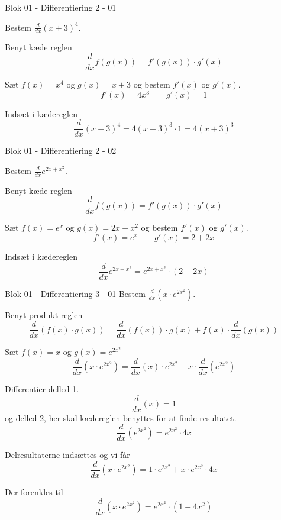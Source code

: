 \documentclass{article}
\begin{document}
\begin{exercise}{Blok 01 - Differentiering 2 - 01}

Bestem $\frac{d}{dx} (x + 3)^4$.


\hint
Benyt kæde reglen
\[
\frac{d}{dx} f(g(x)) = f'(g(x)) \cdot g'(x)
\]

\hint
Sæt $f(x) = x^4$ og $g(x) = x + 3$ og bestem $f'(x)$ og $g'(x)$.
\[
f'(x) = 4 x^3 \qquad g'(x) = 1
\]

\hint
Indsæt i kædereglen
\[
\frac{d}{dx} (x + 3)^4 = 4 (x + 3)^3 \cdot 1 = 4 (x + 3)^3
\]

\end{exercise}

\begin{exercise}{Blok 01 - Differentiering 2 - 02}

Bestem $\frac{d}{dx} e^{2x + x^2}$.


\hint
Benyt kæde reglen
\[
\frac{d}{dx} f(g(x)) = f'(g(x)) \cdot g'(x)
\]

\hint
Sæt $f(x) = e^x$ og $g(x) = 2x + x^2$ og bestem $f'(x)$ og $g'(x)$.
\[
f'(x) = e^x \qquad g'(x) = 2 + 2x
\]

\hint
Indsæt i kædereglen
\[
\frac{d}{dx} e^{2x + x^2} = e^{2x + x^2} \cdot (2 + 2x)
\]

\end{exercise}


\begin{exercise}{Blok 01 - Differentiering 3 - 01}
Bestem $\frac{d}{dx} \left( x \cdot e^{2x^2} \right)$.


\hint
Benyt produkt reglen
\[
\frac{d}{dx} \left( f(x) \cdot g(x) \right) = \frac{d}{dx} \left( f(x) \right) \cdot g(x) + f(x) \cdot \frac{d}{dx} \left( g(x) \right)
\]

\hint
Sæt $f(x) = x$ og $g(x) = e^{2x^2}$
\[
\frac{d}{dx} \left( x \cdot e^{2x^2} \right) = \frac{d}{dx} \left( x \right) \cdot e^{2x^2} + x \cdot \frac{d}{dx} \left( e^{2x^2} \right)
\]

\hint
Differentier delled 1.
\[
\frac{d}{dx} \left( x \right) = 1
\]
og delled 2, her skal kædereglen benyttes for at finde resultatet.
\[
\frac{d}{dx} \left( e^{2x^2} \right) = e^{2x^2} \cdot 4x
\]


\hint
Delresultaterne indsættes og vi får
\[
\frac{d}{dx} \left( x \cdot e^{2x^2} \right) = 1 \cdot e^{2x^2} + x \cdot e^{2x^2} \cdot 4x
\]

\hint
Der forenkles til 
\[
\frac{d}{dx} \left( x \cdot e^{2x^2} \right) = e^{2x^2} \cdot (1 + 4x^2) 
\]

\end{exercise}
\end{document}
